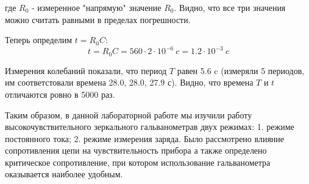\documentclass[14pt]{article}
\begin{document}
где $R_0$ - измеренное "напрямую" значение $R_0$. Видно, что все три значения можно считать равными в пределах погрешности.

\vspace{1cm}
Теперь определим $t = R_0C$:
$$
	t = R_0C = 560\cdot2\cdot10^{-6}~c = 1.2\cdot10^{-3}~c
$$

Измерения колебаний показали, что период $T$ равен 5.6 c (измеряли 5 периодов, им соответстовали времена 28.0, 28.0, 27.9 с). Видно, что времена $T$ и $t$ отличаются ровно в 5000 раз.

\newpage
Таким образом, в данной лабораторной работе мы изучили работу высокочувствительного зеркального гальванометрав двух режимах: 1. режиме постоянного тока; 2. режиме измерения заряда. Было рассмотрено влияние сопротивления цепи на чувствительность прибора а также определено критическое сопротивление, при котором использование гальванометра оказывается наиболее удобным.
\end{document}
